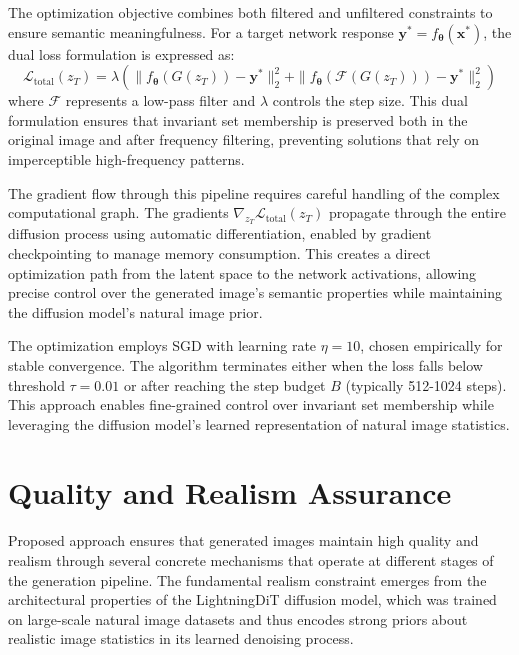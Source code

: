 The optimization objective combines both filtered and unfiltered constraints to ensure semantic meaningfulness. For a target network response $\mathbf{y^*} = f_{\boldsymbol{\theta}}(\mathbf{x^*})$, the dual loss formulation is expressed as:
\begin{equation}
\mathcal{L}_{\text{total}}(z_T) = \lambda \left( \|f_{\boldsymbol{\theta}}(G(z_T)) - \mathbf{y^*}\|_2^2 + \|f_{\boldsymbol{\theta}}(\mathcal{F}(G(z_T))) - \mathbf{y^*}\|_2^2 \right)
\end{equation}
where $\mathcal{F}$ represents a low-pass filter and $\lambda$ controls the step size. This dual formulation ensures that invariant set membership is preserved both in the original image and after frequency filtering, preventing solutions that rely on imperceptible high-frequency patterns.

The gradient flow through this pipeline requires careful handling of the complex computational graph. The gradients $\nabla_{z_T} \mathcal{L}_{\text{total}}(z_T)$ propagate through the entire diffusion process using automatic differentiation, enabled by gradient checkpointing to manage memory consumption. This creates a direct optimization path from the latent space to the network activations, allowing precise control over the generated image's semantic properties while maintaining the diffusion model's natural image prior.

The optimization employs SGD with learning rate $\eta = 10$, chosen empirically for stable convergence. The algorithm terminates either when the loss falls below threshold $\tau = 0.01$ or after reaching the step budget $B$ (typically 512-1024 steps). This approach enables fine-grained control over invariant set membership while leveraging the diffusion model's learned representation of natural image statistics.

\section{Quality and Realism Assurance}\label{method:quality_realism}

Proposed approach ensures that generated images maintain high quality and realism through several concrete mechanisms that operate at different stages of the generation pipeline. The fundamental realism constraint emerges from the architectural properties of the LightningDiT diffusion model, which was trained on large-scale natural image datasets and thus encodes strong priors about realistic image statistics in its learned denoising process.


